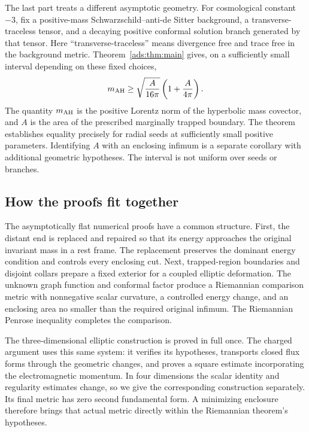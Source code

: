 The last part treats a different asymptotic geometry. For cosmological
constant $-3$, fix a positive-mass Schwarzschild--anti-de Sitter
background, a transverse-traceless tensor, and a decaying positive
conformal solution branch generated by that tensor. Here
``transverse-traceless'' means divergence free and trace free in the
background metric. Theorem~\ref{ads:thm:main} gives, on a sufficiently
small interval depending on these fixed choices,
\[
 m_{\mathrm{AH}}\ge\sqrt{\frac{A}{16\pi}}
                       \left(1+\frac{A}{4\pi}\right).
\]
The quantity $m_{\mathrm{AH}}$ is the positive Lorentz norm of the hyperbolic
mass covector, and $A$ is the area of the prescribed marginally trapped
boundary. The theorem establishes equality precisely for radial seeds
at sufficiently small positive parameters. Identifying $A$ with an
enclosing infimum is a separate corollary with additional geometric
hypotheses. The interval is not uniform over seeds or branches.

\subsection{How the proofs fit together}

The asymptotically flat numerical proofs have a common structure.
First, the distant end is replaced and repaired so that its energy
approaches the original invariant mass in a rest frame. The replacement
preserves the dominant energy condition and controls every enclosing
cut. Next, trapped-region boundaries and disjoint collars prepare a
fixed exterior for a coupled elliptic deformation. The unknown graph
function and conformal factor produce a Riemannian comparison metric
with nonnegative scalar curvature, a controlled energy change, and an
enclosing area no smaller than the required original infimum.
The Riemannian Penrose inequality completes the comparison.

The three-dimensional elliptic construction is proved in full once.
The charged argument uses this same system: it verifies its hypotheses,
transports closed flux forms through the geometric changes, and proves
a square estimate incorporating the electromagnetic momentum.
In four dimensions the scalar identity and regularity estimates
change, so we give the corresponding construction separately.
Its final metric has zero second fundamental form. A minimizing
enclosure therefore brings that actual metric directly within the
Riemannian theorem's hypotheses.


